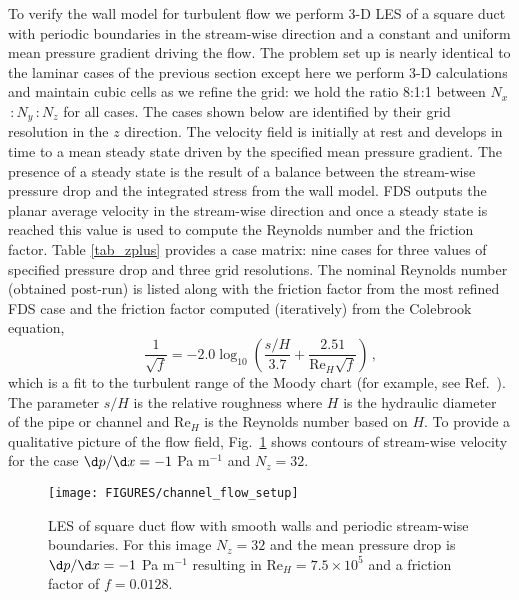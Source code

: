 \documentclass[11pt]{book}
\begin{document}
To verify the wall model for turbulent flow we perform 3-D LES of a square duct with periodic boundaries in the stream-wise direction and a constant and uniform mean pressure gradient driving the flow.  The problem set up is nearly identical to the laminar cases of the previous section except here we perform 3-D calculations and maintain cubic cells as we refine the grid: we hold the ratio 8:1:1 between $N_x$\,:\,$N_y$\,:\,$N_z$ for all cases.  The cases shown below are identified by their grid resolution in the $z$ direction.  The velocity field is initially at rest and develops in time to a mean steady state driven by the specified mean pressure gradient.  The presence of a steady state is the result of a balance between the stream-wise pressure drop and the integrated stress from the wall model.  FDS outputs the planar average velocity in the stream-wise direction and once a steady state is reached this value is used to compute the Reynolds number and the friction factor.  Table \ref{tab_zplus} provides a case matrix: nine cases for three values of specified pressure drop and three grid resolutions.  The nominal Reynolds number (obtained post-run) is listed along with the friction factor from the most refined FDS case and the friction factor computed (iteratively) from the Colebrook equation,
\begin{equation}
\label{eqn_colebrook}
\frac{1}{\sqrt{f}} = -2.0 \log_{10} \left( \frac{s/H}{3.7} + \frac{2.51}{\mbox{Re}_H\sqrt{f}} \right) \,\mbox{,}
\end{equation}
which is a fit to the turbulent range of the Moody chart (for example, see Ref.~\cite{MYO}).  The parameter $s/H$ is the relative
roughness where $H$ is the hydraulic diameter of the pipe or channel and Re$_H$ is the Reynolds number based on $H$.
To provide a qualitative picture of the flow field, Fig.~\ref{fig_channel_flow_setup} shows contours of stream-wise velocity
for the case $\d p/\d x = -1$ Pa m$^{-1}$ and $N_z=32$.

\begin{figure}
\centering
\texttt{[image: FIGURES/channel\_flow\_setup]}
\caption[LES of square duct flow]{LES of square duct flow with smooth walls and periodic stream-wise boundaries.  For this image $N_z=32$ and the mean pressure drop is $\d p/ \d x = -1$ Pa m$^{-1}$ resulting in Re$_H = 7.5\times 10^5$ and a friction factor of $f=0.0128$.}
\label{fig_channel_flow_setup}
\end{figure}
\end{document}
